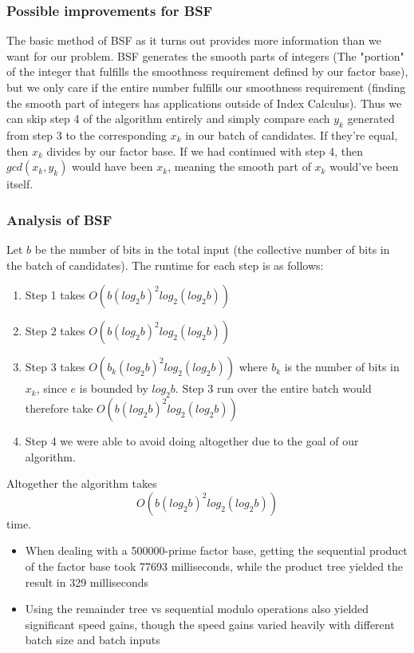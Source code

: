 \documentclass{article}
\begin{document}
        \subsubsection{Possible improvements for BSF}
        The basic method of BSF as it turns out provides more information than we want for our problem.  BSF generates the smooth parts of integers (The "portion" of the integer that fulfills the smoothness requirement defined by our factor base), but we only care if the entire number fulfills our smoothness requirement (finding the smooth part of integers has applications outside of Index Calculus).  Thus we can skip step 4 of the algorithm entirely and simply compare each $y_k$ generated from step 3 to the corresponding $x_k$ in our batch of candidates.  If they're equal, then $x_k$ divides by our factor base.  If we had continued with step 4, then $gcd(x_k, y_k)$ would have been $x_k$, meaning the smooth part of $x_k$ would've been itself.
        \subsubsection{Analysis of BSF}
        Let $b$ be the number of bits in the total input (the collective number of bits in the batch of candidates).  The runtime for each step is as follows: \\
        \begin{enumerate}
          \item Step 1 takes $O(b(log_2 b)^2log_2 (log_2 b))$ \autocite{Bernstein2008}
          \item Step 2 takes $O(b(log_2 b)^2log_2 (log_2 b))$ \autocite{Bernstein2008}
          \item Step 3 takes $O(b_k(log_2 b)^2log_2 (log_2 b))$ where $b_k$ is the number of bits in $x_k$, since $e$ is bounded by $log_2 b$.  Step 3 run over the entire batch would therefore take $O(b(log_2 b)^2log_2 (log_2 b))$
          \item Step 4 we were able to avoid doing altogether due to the goal of our algorithm.
        \end{enumerate}
        Altogether the algorithm takes $$O(b(log_2 b)^2log_2 (log_2 b))$$ time.
        \begin{itemize}
          \item When dealing with a 500000-prime factor base, getting the sequential product of the factor base took 77693 milliseconds, while the product tree yielded the result in 329 milliseconds
          \item Using the remainder tree vs sequential modulo operations also yielded significant speed gains, though the speed gains varied heavily with different batch size and batch inputs
        \end{itemize}
\end{document}
